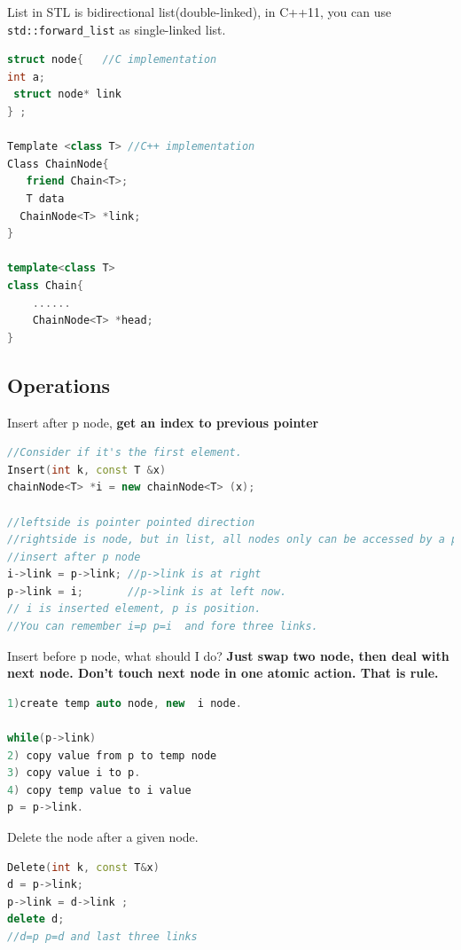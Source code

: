 \documentclass[a4paper,11pt,twoside]{book}
\begin{document}
	\par List in STL is bidirectional list(double-linked), in C++11, you can use \texttt{std::forward\_list} as single-linked list. 

\begin{lstlisting}[frame=single, language=c++]
struct node{   //C implementation
int a; 
 struct node* link
} ;

Template <class T> //C++ implementation
Class ChainNode{
   friend Chain<T>;
   T data
  ChainNode<T> *link;
}

template<class T>
class Chain{
	......
	ChainNode<T> *head;
}
\end{lstlisting}


\subsection{Operations}

\par Insert after p node, \textbf{get an index to previous pointer}
\begin{lstlisting}[frame=single, language=c++, mathescape=true]
//Consider if it's the first element. 
Insert(int k, const T &x)
chainNode<T> *i = new chainNode<T> (x);

//leftside is pointer pointed direction
//rightside is node, but in list, all nodes only can be accessed by a pointer.
//insert after p node 
i->link = p->link; //p->link is at right
p->link = i;       //p->link is at left now.
// i is inserted element, p is position.  
//You can remember i=p p=i  and fore three links.
\end{lstlisting}

	\par Insert before p node, what should I do?  \textbf{Just swap two node, then deal with next node. Don't touch next node in one atomic action. That is rule. }
\begin{lstlisting}[frame=single, language=c++, mathescape=true]
1)create temp auto node, new  i node.
 
while(p->link) 
2) copy value from p to temp node
3) copy value i to p.
4) copy temp value to i value
p = p->link.  
\end{lstlisting}

	\par Delete the node after a given node.
\begin{lstlisting}[frame=single, language=c++]
Delete(int k, const T&x)
d = p->link;
p->link = d->link ;
delete d;
//d=p p=d and last three links
\end{lstlisting}
\end{document}

